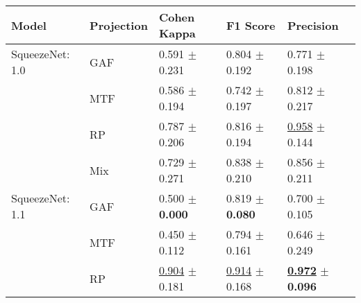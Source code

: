 
\begin{tabular}[t]{lllll}
\toprule
Model & Projection & Cohen Kappa & F1 Score & Precision \\
\midrule
SqueezeNet: 1.0 & GAF & \textcolor[rgb]{0.6980519481,0.3019480519,0}{0.591} $\pm$ \textcolor[rgb]{0.8530779188,0.1469220812,0}{0.231} & \textcolor[rgb]{0.7070895522,0.2929104478,0}{0.804} $\pm$ \textcolor[rgb]{0.8583441002,0.1416558998,0}{0.192} & \textcolor[rgb]{0.6170212766,0.3829787234,0}{0.771} $\pm$ \textcolor[rgb]{0.6675251387,0.3324748613,0}{0.198} \\
 & MTF & \textcolor[rgb]{0.7077922078,0.2922077922,0}{0.586} $\pm$ \textcolor[rgb]{0.7152531697,0.2847468303,0}{0.194} & \textcolor[rgb]{1.0000000000,0.0000000000,0}{0.742} $\pm$ \textcolor[rgb]{0.8966243553,0.1033756447,0}{0.197} & \textcolor[rgb]{0.4893617021,0.5000000000,0}{0.812} $\pm$ \textcolor[rgb]{0.7870464475,0.2129535525,0}{0.217} \\
 & RP & \textcolor[rgb]{0.2767857143,0.5000000000,0}{0.787} $\pm$ \textcolor[rgb]{0.7594565120,0.2405434880,0}{0.206} & \textcolor[rgb]{0.6529850746,0.3470149254,0}{0.816} $\pm$ \textcolor[rgb]{0.8799950911,0.1200049089,0}{0.194} & \underline{\textcolor[rgb]{0.0425531915,0.5000000000,0}{0.958}} $\pm$ \textcolor[rgb]{0.3148185790,0.5000000000,0}{0.144} \\
 & Mix & \textcolor[rgb]{0.4017857143,0.5000000000,0}{0.729} $\pm$ \textcolor[rgb]{1.0000000000,0.0000000000,0}{0.271} & \textcolor[rgb]{0.5505427408,0.4494572592,0}{0.838} $\pm$ \textcolor[rgb]{1.0000000000,0.0000000000,0}{0.210} & \textcolor[rgb]{0.3558994197,0.5000000000,0}{0.856} $\pm$ \textcolor[rgb]{0.7517868189,0.2482131811,0}{0.211} \\
SqueezeNet: 1.1 & GAF & \textcolor[rgb]{0.8928571429,0.1071428571,0}{0.500} $\pm$ \textbf{\textcolor[rgb]{0.0000000000,0.5000000000,0}{0.000}} & \textcolor[rgb]{0.6380597015,0.3619402985,0}{0.819} $\pm$ \textbf{\textcolor[rgb]{0.0000000000,0.5000000000,0}{0.080}} & \textcolor[rgb]{0.8340425532,0.1659574468,0}{0.700} $\pm$ \textcolor[rgb]{0.0600957910,0.5000000000,0}{0.105} \\
 & MTF & \textcolor[rgb]{1.0000000000,0.0000000000,0}{0.450} $\pm$ \textcolor[rgb]{0.4127015637,0.5000000000,0}{0.112} & \textcolor[rgb]{0.7561058345,0.2438941655,0}{0.794} $\pm$ \textcolor[rgb]{0.6193728092,0.3806271908,0}{0.161} & \textcolor[rgb]{1.0000000000,0.0000000000,0}{0.646} $\pm$ \textcolor[rgb]{1.0000000000,0.0000000000,0}{0.249} \\
 & RP & \underline{\textcolor[rgb]{0.0267857143,0.5000000000,0}{0.904}} $\pm$ \textcolor[rgb]{0.6699061080,0.3300938920,0}{0.181} & \underline{\textcolor[rgb]{0.1921641791,0.5000000000,0}{0.914}} $\pm$ \textcolor[rgb]{0.6797068695,0.3202931305,0}{0.168} & \underline{\textbf{\textcolor[rgb]{0.0000000000,0.5000000000,0}{0.972}}} $\pm$ \textbf{\textcolor[rgb]{0.0000000000,0.5000000000,0}{0.096}} \\

\end{tabular}
